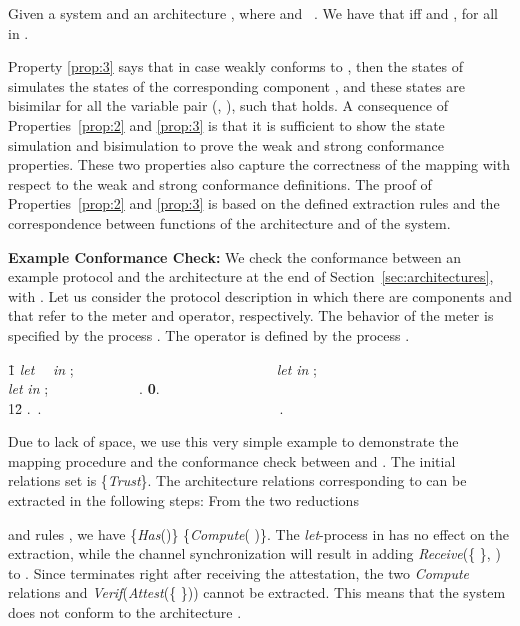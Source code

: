 \documentclass{llncs}
\begin{document}
\begin{ttp}
\label{prop:3} 
Given a system  and an architecture , where    and 
\mbox{  }. We have that    iff 
   and    , 
for all  in . 
\end{ttp}

Property \ref{prop:3} says that in case  weakly conforms to , then the states of  simulates 
the states of the corresponding component , and these states are bisimilar for all the variable pair 
(, ), such that  holds.
A consequence of Properties~\ref{prop:2} and \ref{prop:3} is that it is sufficient to show the state simulation and bisimulation to prove the weak and strong conformance properties. These two properties also 
capture the correctness of the mapping with respect to the weak and strong conformance definitions. 
The proof of Properties~\ref{prop:2} and \ref{prop:3} is based on the defined extraction rules and 
the correspondence between functions  of the architecture and  of the 
system.

\textbf{Example Conformance Check:} We check the conformance between an example protocol and the architecture 
 at the end of Section~\ref{sec:architectures}, with   . Let us consider the protocol  
description in which there are components  and  that refer to the meter and 
operator, respectively. The behavior of the meter is specified by the process . 
The operator is defined by the process  . 

\begin{tabbing}
    1\=\kill
       \textit{let}   \ \ \textit{in} ;\ \ \ \ \ \ \ \ \ \ \ \ \ \ \ \ \ \ \ \ \ \ \ \ \ \ \ \ \   \textit{let}     \textit{in} ;\\
    \>    
    \textit{let}     \textit{in} ;\ \ \ \ \ \ \ \ \ \ \ \ \  
      . \textbf{0}.\\ 
    12\=\kill
      .\ .\ \ \ \ \ \ \ \ \ \ \ \ \ \ \ \ \ \ \ \ \ \ \ \ \ \ \ \ \ \ \ \ \ \     .  
\end{tabbing}

Due to lack of space, we use this very simple example to demonstrate the mapping procedure and the conformance 
check between  and . The initial relations set  is \{\textit{Trust}\}. 
The architecture relations corresponding to  can be extracted in the following steps: From the two reductions 

  
  
 
  
  
and rules ,  we have     \{\textit{Has}()\}  \{\textit{Compute}(  )\}. The \textit{let}-process in  has no effect on the extraction, while the channel synchronization will result in adding \textit{Receive}(\{  \}, ) to . Since  terminates right after receiving the attestation, the two \textit{Compute}  relations and \textit{Verif}(\textit{Attest}(\{  \})) cannot be extracted. 
This means that the system  does not conform to the architecture .    
  
\end{document}
